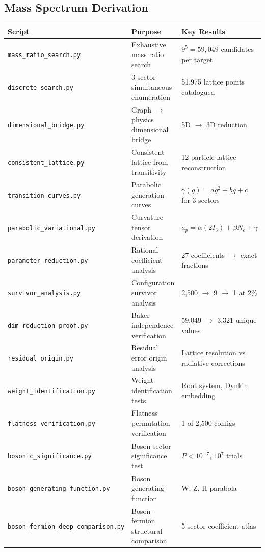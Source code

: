 \subsection{Mass Spectrum Derivation}\label{app:mass_code}

\begin{center}
\small
{}
\label{tab:mass_scripts}
\begin{tabular}{lll}
\hline\hline
Script & Purpose & Key Results \\
\hline
\texttt{mass\_ratio\_search.py} & Exhaustive mass ratio search & $9^5 = 59{,}049$ candidates per target \\
\texttt{discrete\_search.py} & 3-sector simultaneous enumeration & 51,975 lattice points catalogued \\
\texttt{dimensional\_bridge.py} & Graph $\to$ physics dimensional bridge & 5D $\to$ 3D reduction \\
\texttt{consistent\_lattice.py} & Consistent lattice from transitivity & 12-particle lattice reconstruction \\
\texttt{transition\_curves.py} & Parabolic generation curves & $\gamma(g) = ag^2 + bg + c$ for 3 sectors \\
\texttt{parabolic\_variational.py} & Curvature tensor derivation & $a_p = \alpha(2I_3) + \beta N_c + \gamma$ \\
\texttt{parameter\_reduction.py} & Rational coefficient analysis & 27 coefficients $\to$ exact fractions \\
\texttt{survivor\_analysis.py} & Configuration survivor analysis & 2,500 $\to$ 9 $\to$ 1 at 2\% \\
\texttt{dim\_reduction\_proof.py} & Baker independence verification & 59,049 $\to$ 3,321 unique values \\
\texttt{residual\_origin.py} & Residual error origin analysis & Lattice resolution vs radiative corrections \\
\texttt{weight\_identification.py} & Weight identification tests & Root system, Dynkin embedding \\
\texttt{flatness\_verification.py} & Flatness permutation verification & 1 of 2,500 configs \\
\texttt{bosonic\_significance.py} & Boson sector significance test & $P < 10^{-7}$, $10^7$ trials \\
\texttt{boson\_generating\_function.py} & Boson generating function & W, Z, H parabola \\
\texttt{boson\_fermion\_deep\_comparison.py} & Boson-fermion structural comparison & 5-sector coefficient atlas \\

\end{tabular}
\end{center}
